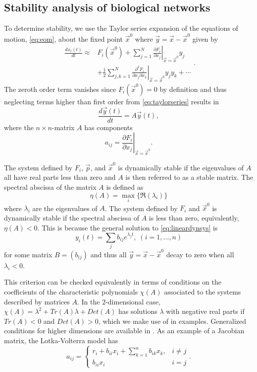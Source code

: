 \subsection{Stability analysis of biological networks}
To determine stability, we use the Taylor series expansion of the equations of motion, \ref{eq:eom}, about the fixed point $\vec{x}^0$ where $\vec{y} = \vec{x} - \vec{x}^0$ given by
\begin{equation}\label{eq:taylorseries}
\begin{aligned}
\frac{dx_i(t)}{dt} \approx & F_i(\vec{x}^0)
+ \sum_{j=1}^{N} \left. \frac{\partial F_i}{\partial x_j} \right|_{\vec{x} = \vec{x}^0} y_j\\
& + \frac{1}{2}\sum_{j,k=1}^{N} \left. \frac{\partial^2 F_i}{\partial x_j \partial x_k} \right|_{\vec{x} = \vec{x}^0} y_j y_k + \cdots
\end{aligned}.
\end{equation}
The zeroth order term vanishes since $F_i(\vec{x}^0)=0$ by definition and thus neglecting terms higher than first order from \ref{eq:taylorseries} results in
\begin{equation}\label{eq:lineardynsys}
\frac{d\vec{y}(t)}{dt} = A \vec{y}(t),
\end{equation}
where the $n \times n$-matrix $A$ has components
$$
a_{ij} = \left. \frac{\partial F_i}{\partial x_j} \right|_{\vec{x} = \vec{x}^0}.
$$

The system defined by $F_i$, $\vec{p}$, and $\vec{x}^0$ is dynamically stable if the eigenvalues of $A$ all have real parts less than zero and $A$ is then referred to as a stable matrix. The spectral abscissa of the matrix $A$ is defined as
$$
\eta(A) = \max_i \{\Re(\lambda_i)\}
$$
where $\lambda_i$ are the eigenvalues of $A$. The system defined by $F_i$ and $\vec{x}^0$ is dynamically stable if the spectral abscissa of $A$ is less than zero, equivalently, $\eta(A) < 0$. This is because the general solution to \ref{eq:lineardynsys} is
$$
y_i(t) = \sum_j b_{ij} e^{\lambda_j t}, \; (i=1,\ldots,n)
$$
for some matrix $B=(b_{ij})$ and thus all $\vec{y} = \vec{x} - \vec{x}^0$ decay to zero when all $\lambda_i < 0$.

This criterion can be checked equivalently in terms of conditions on the coefficients of the characteristic polynomials $\chi(A)$ associated to the systems described by matrices $A$. In the $2$-dimensional case, $\chi(A) = \lambda^2 + Tr(A)\lambda+Det(A)$ has solutions $\lambda$ with negative real parts if $Tr(A)<0$ and $Det(A)>0$, which we make use of in examples. Generalized conditions for higher dimensions are available in \cite{Gantmacher1959}. As an example of a Jacobian matrix, the Lotka-Volterra model has
 \begin{equation}\label{eq:lotkavolterrajacobian}
   a_{ij} = \left\{
     \begin{array}{lr}
       r_i + b_{ii} x_i + \sum_{k=1}^{n} b_{ik} x_{k}, & i \neq j\\
       b_{ii} x_i & i=j
     \end{array}.
   \right.
\end{equation}

